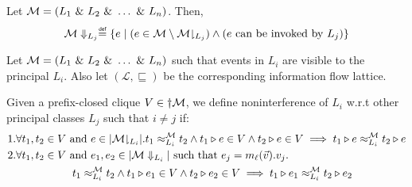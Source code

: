 \documentclass[acmsmall,screen,review, nonacm]{acmart}
\begin{document}
\begin{definition}
  Let $\classpart = (L_1 \directprod L_2 \directprod \dots \directprod L_n)$. Then,
  \[
   \downgrade{\classpart}{L_j} \isdef \{ e \mid (e \in \classpart \setminus \proj{\classpart}{L_j}) \wedge (e \text{ can be invoked by } L_j) \}
  \]
  
\end{definition}


\begin{definition}\label{def:ni2}
  Let $\classpart = (L_1 \directprod L_2 \directprod \dots \directprod L_n)$ such that events in $L_i$ are visible to the principal $L_i$.
  Also let $(\mathcal{L}, \sqsubseteq)$ be the corresponding information flow lattice.
  
  Given a prefix-closed clique $V \in \dagger \classpart $, we define noninterference of $L_i$ w.r.t other principal classes $L_j$ such that $i \ne j$ if:
   \begin{align*}
     & 1. \forall t_1, t_2 \in V \text{ and }  e \in \abs{\proj{\classpart}{L_i}}. \treq{t_1}{t_2}{L_i}{\classpart}  \wedge t_1 \tracecat e \in V \wedge t_2 \tracecat  e \in V \implies \treq{t_1  \tracecat  e}{t_2 \tracecat  e}{L_i}{\classpart} \\
     & 2. \forall t_1, t_2 \in V \text{ and }  e_1, e_2 \in \abs{\downgrade{\classpart}{L_i}} \text{ such that } e_j = m_{\ell}(\vec{v}).v_j. \\
     & \qquad \qquad \qquad \treq{t_1}{t_2}{L_i}{\classpart}  \wedge t_1 \tracecat e_1 \in V \wedge t_2 \tracecat  e_2 \in V \implies \treq{t_1  \tracecat  e_1}{t_2 \tracecat  e_2}{L_i}{\classpart}
   \end{align*}
\end{definition}





\end{document}
